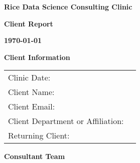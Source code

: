 \documentclass[12pt]{article}
\begin{document}





\vspace{.2in}


\begin{center} {\bf \LARGE Rice Data Science Consulting Clinic} 
\bigskip

{\bf \Large Client Report} 
\bigskip

{\bf \today}

\end{center}

\vspace{.15in}



\noindent\begin{center} {\bf Client Information} \end{center}

\noindent\begin{tabular}{ll}
Clinic Date: \hspace{1in} & %
\\
Client Name: & %
\\
Client Email: & %
\\
Client Department or Affiliation: & %
\\
Returning Client: & %
\end{tabular}






\noindent\begin{center} {\bf Consultant Team} \end{center}
\end{document}
